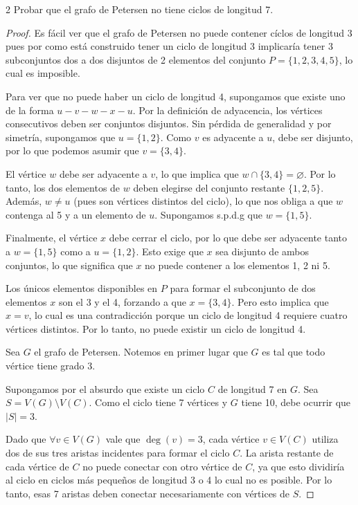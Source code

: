 \begin{ejercicioEntregar}{2}
    Probar que el grafo de Petersen no tiene ciclos de longitud 7.
\end{ejercicioEntregar}
\begin{proof}
    Es fácil ver que el grafo de Petersen no puede contener cíclos de longitud 3 pues por como está construido tener un ciclo de longitud 3 implicaría tener 3 subconjuntos dos a dos disjuntos de 2 elementos del conjunto \( P = \{1,2,3,4,5\} \), lo cual es imposible.

    Para ver que no puede haber un ciclo de longitud 4, supongamos que existe uno de la forma \( u - v - w - x - u \). Por la definición de adyacencia, los vértices consecutivos deben ser conjuntos disjuntos. Sin pérdida de generalidad y por simetría, supongamos que \( u = \{1, 2\} \). Como \( v \) es adyacente a \( u \), debe ser disjunto, por lo que podemos asumir que \( v = \{3, 4\} \).

    El vértice \( w \) debe ser adyacente a \( v \), lo que implica que \( w \cap \{3, 4\} = \varnothing \). Por lo tanto, los dos elementos de \( w \) deben elegirse del conjunto restante \( \{1, 2, 5\} \). Además, \( w \neq u \) (pues son vértices distintos del ciclo), lo que nos obliga a que \( w \) contenga al 5 y a un elemento de \( u \). Supongamos s.p.d.g que \( w = \{1, 5\} \).

    Finalmente, el vértice \( x \) debe cerrar el ciclo, por lo que debe ser adyacente tanto a \( w = \{1, 5\} \) como a \( u = \{1, 2\} \). Esto exige que \( x \) sea disjunto de ambos conjuntos, lo que significa que \( x \) no puede contener a los elementos 1, 2 ni 5.

    Los únicos elementos disponibles en \( P \) para formar el subconjunto de dos elementos \( x \) son el 3 y el 4, forzando a que \( x = \{3, 4\} \). Pero esto implica que \( x = v \), lo cual es una contradicción porque un ciclo de longitud 4 requiere cuatro vértices distintos. Por lo tanto, no puede existir un ciclo de longitud 4.

    Sea \( G \) el grafo de Petersen. Notemos en primer lugar que \( G \) es tal que todo vértice tiene grado 3.

    Supongamos por el absurdo que existe un ciclo \( C \) de longitud 7 en \( G \). Sea \( S = V(G) \setminus V(C) \). Como el ciclo tiene 7 vértices y \( G \) tiene 10, debe ocurrir que \( |S| = 3 \).

    Dado que \( \forall v \in V(G) \) vale que \( \deg(v) = 3 \), cada vértice \( v \in V(C) \) utiliza dos de sus tres aristas incidentes para formar el ciclo \( C \). La arista restante de cada vértice de \( C \) no puede conectar con otro vértice de \( C \), ya que esto dividiría al ciclo en ciclos más pequeños de longitud 3 o 4 lo cual no es posible. Por lo tanto, esas 7 aristas deben conectar necesariamente con vértices de \( S \).


\end{proof}
